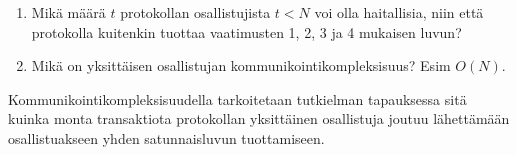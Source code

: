 \begin{enumerate}
    \item Mikä määrä $t$ protokollan osallistujista $t < N$ voi olla haitallisia, niin että protokolla kuitenkin tuottaa vaatimusten 1, 2, 3 ja 4 mukaisen luvun?
    \item Mikä on yksittäisen osallistujan kommunikointikompleksisuus? Esim $O(N)$.
\end{enumerate}

Kommunikointikompleksisuudella tarkoitetaan tutkielman tapauksessa sitä kuinka monta transaktiota protokollan yksittäinen osallistuja joutuu lähettämään osallistuakseen yhden satunnaisluvun tuottamiseen. 

